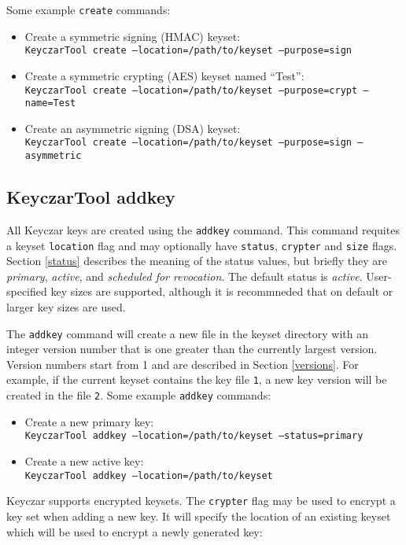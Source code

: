 \documentclass{llncs}
\begin{document}
Some example {\tt create} commands:
\begin{itemize}
\item Create a symmetric signing (HMAC) keyset: \\
{\tt KeyczarTool create --location=/path/to/keyset --purpose=sign}
\item Create a symmetric crypting (AES) keyset named ``Test'': \\
{\tt KeyczarTool create --location=/path/to/keyset --purpose=crypt --name=Test}
\item Create an asymmetric signing (DSA) keyset: \\
{\tt KeyczarTool create --location=/path/to/keyset --purpose=sign --asymmetric} 
\end{itemize}

\subsection{KeyczarTool addkey}

All Keyczar keys are created using the {\tt addkey} command. This command
requites a keyset {\tt location} flag and may optionally have {\tt status},
{\tt crypter} and {\tt size} flags. Section \ref{status} describes the meaning
of the status values, but briefly they are {\it primary}, {\it active}, and {\it
scheduled for revocation}. The default status is {\it active}. User-specified
key sizes are supported, although it is recommneded that on default or larger
key  sizes are used.

The {\tt addkey} command will create a new file in the keyset directory with an
integer version number that is one greater than the currently largest version.
Version numbers start from 1 and are described in Section \ref{versions}. For
example, if the current keyset contains the key file {\tt 1}, a new key version
will be created in the file {\tt 2}. Some example {\tt addkey} commands:
\begin{itemize}
\item Create a new primary key: \\
{\tt KeyczarTool addkey --location=/path/to/keyset --status=primary}
\item Create a new active key: \\
{\tt KeyczarTool addkey --location=/path/to/keyset} 
\end{itemize}

Keyczar supports encrypted keysets. The {\tt crypter} flag may be used to
encrypt a key set when adding a new key. It will specify the location of an
existing keyset which will be used to encrypt a newly generated key: 
 
\end{document}
